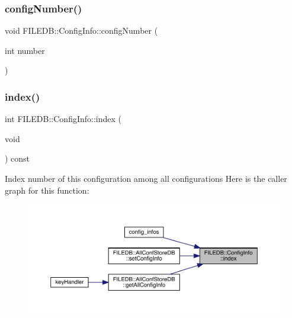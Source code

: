 \subsubsection{\texorpdfstring{configNumber()}{configNumber()}\hspace{0.1cm}{\footnotesize\ttfamily [6/6]}}
{\footnotesize\ttfamily void F\+I\+L\+E\+D\+B\+::\+Config\+Info\+::config\+Number (\begin{DoxyParamCaption}\item[{int}]{number }\end{DoxyParamCaption})}

\mbox{\label{classFILEDB_1_1ConfigInfo_a1ea886d3469211d480bf2c26d474c365}} 
\subsubsection{\texorpdfstring{index()}{index()}\hspace{0.1cm}{\footnotesize\ttfamily [1/6]}}
{\footnotesize\ttfamily int F\+I\+L\+E\+D\+B\+::\+Config\+Info\+::index (\begin{DoxyParamCaption}\item[{void}]{ }\end{DoxyParamCaption}) const}

Index number of this configuration among all configurations Here is the caller graph for this function\+:
\nopagebreak
\begin{figure}[H]
\begin{center}
\leavevmode
\includegraphics[width=350pt]{d0/d90/classFILEDB_1_1ConfigInfo_a1ea886d3469211d480bf2c26d474c365_icgraph}
\end{center}
\end{figure}
\mbox{\label{classFILEDB_1_1ConfigInfo_a1ea886d3469211d480bf2c26d474c365}} 
